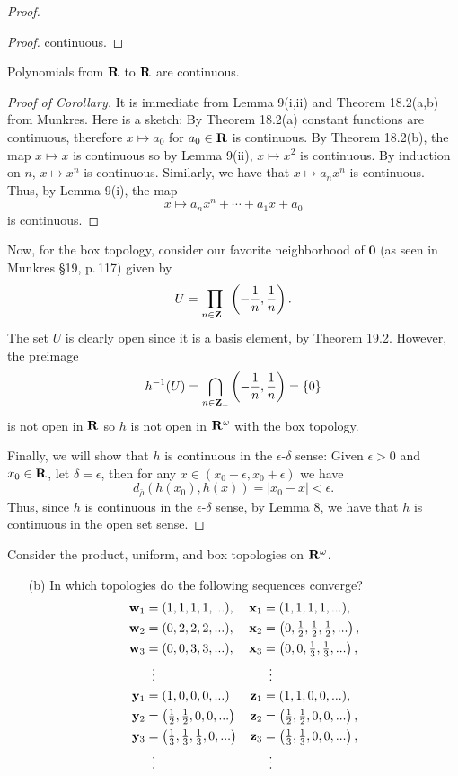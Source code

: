 \begin{proof}
\begin{proof}
continuous.
\end{proof}
\begin{corollary*}
Polynomials from $\mathbf{R}$ to $\mathbf{R}$ are continuous.
\end{corollary*}
\begin{proof}[Proof of Corollary]
\renewcommand\qedsymbol{$\clubsuit$}
It is immediate from Lemma 9(i,ii) and Theorem 18.2(a,b) from
Munkres. Here is a sketch: By Theorem 18.2(a) constant functions
are continuous, therefore $x\mapsto a_0$ for $a_0\in\mathbf{R}$ is
continuous. By Theorem 18.2(b), the map $x\mapsto x$ is
continuous so by Lemma 9(ii), $x\mapsto x^2$ is continuous. By
induction on $n$, $x\mapsto x^n$ is continuous. Similarly, we
have that $x\mapsto a_nx^n$ is continuous. Thus, by Lemma 9(i),
the map
\[
x\longmapsto a_nx^n+\cdots+a_1x+a_0
\]
is continuous.
\end{proof}
Now, for the box topology, consider our favorite neighborhood of
$\mathbf{0}$ (as seen in Munkres \S19, p.\,117) given by
\[
U=\prod_{n\in\mathbf{Z}_+}\left(-\frac{1}{n},\frac{1}{n}\right).
\]
The set $U$ is clearly open since it is a basis element, by
Theorem 19.2. However, the preimage
\[
h^{-1}(U)=\bigcap_{n\in\mathbf{Z}_+}\left(-\frac{1}{n},\frac{1}{n}\right)=\{0\}
\]
is not open in $\mathbf{R}$ so $h$ is not open in $\mathbf{R}^\omega$ with the
box topology.

Finally, we will show that $h$ is continuous in the
$\epsilon$-$\delta$ sense: Given $\epsilon>0$ and $x_0\in\mathbf{R}$,
let $\delta=\epsilon$, then for any
$x\in(x_0-\epsilon,x_0+\epsilon)$ we have
\[
d_{\bar\rho}\left(h(x_0),h(x)\right)
=|x_0-x|<\epsilon.
\]
Thus, since $h$ is continuous in the $\epsilon$-$\delta$ sense,
by Lemma 8, we have that $h$ is continuous in the open set sense.
\end{proof}
\newpage
\begin{problem}[Munkres \S20, Ex.\,4(b)]
Consider the product, uniform, and box topologies on
$\mathbf{R}^\omega$.
\begin{enumerate}[noitemsep]
\item[(b)] In which topologies do the following sequences
  converge?
\begin{align*}
\mathbf{w}_1&=(1,1,1,1,...),&\mathbf{x}_1&=(1,1,1,1,...),\\
\mathbf{w}_2&=(0,2,2,2,...),&\mathbf{x}_2&=\left(0,\tfrac{1}{2},\tfrac{1}{2},\tfrac{1}{2},...\right),\\
\mathbf{w}_3&=(0,0,3,3,...),&\mathbf{x}_3&=\left(0,0,\tfrac{1}{3},\tfrac{1}{3},...\right),\\
&\vdotswithin{=}&&\vdotswithin{=}\\
\mathbf{y}_1&=(1,0,0,0,...)&\mathbf{z}_1&=(1,1,0,0,...),\\
\mathbf{y}_2&=\left(\tfrac{1}{2},\tfrac{1}{2},0,0,...\right)&\mathbf{z}_2&=\left(\tfrac{1}{2},\tfrac{1}{2},0,0,...\right),\\
\mathbf{y}_3&=\left(\tfrac{1}{3},\tfrac{1}{3},\tfrac{1}{3},0,...\right)&\mathbf{z}_3&=\left(\tfrac{1}{3},\tfrac{1}{3},0,0,...\right),\\
&\vdotswithin{=}&&\vdotswithin{=}
\end{align*}
\end{enumerate}
\end{problem}
